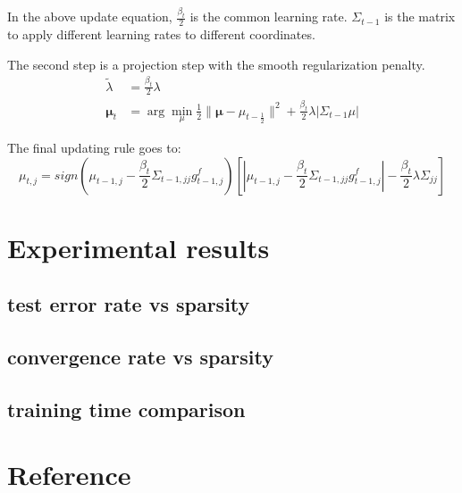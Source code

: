 \documentclass{article}
\begin{document}
In the above update equation, $\frac{\beta_t}{2}$ is the common learning rate.
$\Sigma_{t-1}$ is the matrix to apply different learning rates to different
coordinates.

The second step is a projection step with the smooth regularization penalty.
\begin{equation}
    \begin{aligned}
        \tilde{\lambda} &= \frac{\beta_t}{2} \lambda \\
        \bm{\mu}_{t} &= \arg\min_{\mu}{\frac{1}{2}\|\bm{\mu} -
        \mu_{t-\frac{1}{2}}\|^2
        + \frac{\beta_t}{2}\lambda|\Sigma_{t-1}\mu|}
    \end{aligned}
    \label{equ:08}
\end{equation}


The final updating rule goes to:
\begin{equation}
    \mu_{t,j} = sign(\mu_{t-1,j} -
    \frac{\beta_t}{2}\Sigma_{t-1,jj}g_{t-1,j}^f)
    [|\mu_{t-1,j} - \frac{\beta_t}{2}\Sigma_{t-1,jj}g_{t-1,j}^f| -
    \frac{\beta_t}{2}\lambda\Sigma_{jj}]
    \label{equ:09}
\end{equation}

\section{Experimental results}
\subsection{test error rate vs sparsity}
\subsection{convergence rate vs sparsity}
\subsection{training time comparison}

\section{Reference}
\end{document}
